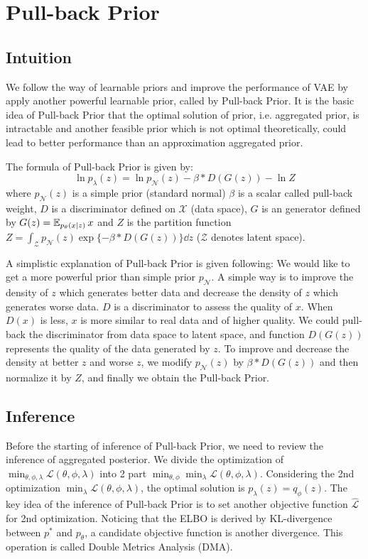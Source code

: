 \section{Pull-back Prior}\label{sec:pull_back_prior}

\subsection{Intuition}
We follow the way of learnable priors and improve the performance of VAE by apply another powerful learnable prior, called by Pull-back Prior. It is the basic idea of Pull-back Prior that the optimal solution of prior, i.e. aggregated prior, is intractable and another feasible prior which is not optimal theoretically, could lead to better performance than an approximation aggregated prior.

The formula of Pull-back Prior is given by:
\begin{equation}\label{eq:pull_back_prior}
	\ln p_\lambda(z) = \ln p_\mathcal{N}(z) - \beta * D(G(z)) - \ln Z \tag{4}
\end{equation}
where $p_\mathcal{N}(z)$ is a simple prior (\EG standard normal) $\beta$ is a scalar called pull-back weight, $D$ is a discriminator defined on $\mathcal{X}$ (data space), $G$ is an generator defined by $G(z) = \operatorname{\mathbb{E}}_{p_\theta(x|z)} x$ and $Z$ is the partition function $Z = \int_{\mathcal{Z}} p_\mathcal{N}(z) \exp\{- \beta * D(G(z))\} \dd z$ ($\mathcal{Z}$ denotes latent space).

A simplistic explanation of Pull-back Prior is given following: We would like to get a more powerful prior than simple prior $p_\mathcal{N}$. A simple way is to improve the density of $z$ which generates better data and decrease the density of $z$ which generates worse data. $D$ is a discriminator to assess the quality of $x$. When $D(x)$ is less, $x$ is more similar to real data and of higher quality. We could pull-back the discriminator from data space to latent space, and function $D(G(z))$ represents the quality of the data generated by $z$. To improve and decrease the density at better $z$ and worse $z$, we modify $p_\mathcal{N}(z)$ by $\beta * D(G(z))$ and then normalize it by $Z$, and finally we obtain the Pull-back Prior. 

\subsection{Inference}

Before the starting of inference of Pull-back Prior, we need to review the inference of aggregated posterior. We divide the optimization of $\min_{\theta, \phi, \lambda} \mathcal{L}(\theta, \phi, \lambda)$ into 2 part $\min_{\theta, \phi} \min_{\lambda} \mathcal{L}(\theta, \phi, \lambda)$. Considering the 2nd optimization $\min_\lambda \mathcal{L}(\theta, \phi, \lambda)$, the optimal solution is $p_\lambda(z) = q_\phi(z)$. The key idea of the inference of Pull-back Prior is to set another objective function $\hat{\mathcal{L}}$ for 2nd optimization. Noticing that the ELBO is derived by KL-divergence between $p^*$ and $p_\theta$, a candidate objective function is another divergence. This operation is called Double Metrics Analysis (DMA). 

